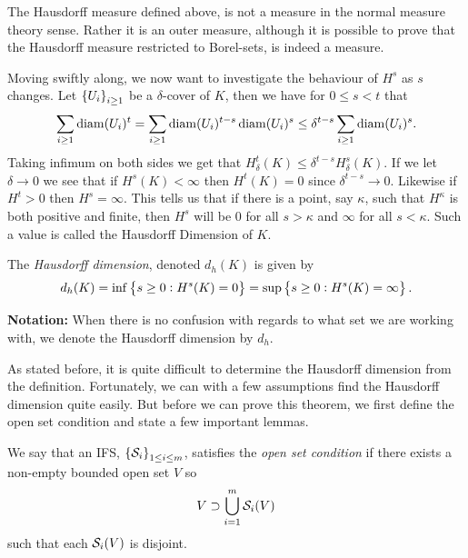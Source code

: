 \medskip
\begin{remark}
	The Hausdorff measure defined above, is not a measure in the normal measure theory sense. Rather it is an outer measure, although it is possible to prove that the Hausdorff measure restricted to Borel-sets, is indeed a measure.
\end{remark}

\medskip
Moving swiftly along, we now want to investigate the behaviour of $H^{s}$ as $s$ changes. Let $\cbr{U_i}_{i \geq 1}$ be a $\delta$-cover of $K$, then we have for $0 \leq s < t$ that
\begin{equation}
	\sum_{i \geq 1} \diam(U_i)^{t} = \sum_{i \geq 1} \diam(U_i)^{t-s}\diam(U_i)^{s} \leq \delta^{t-s}\sum_{i \geq 1}\diam(U_i)^{s}.
\end{equation}
Taking infimum on both sides we get that $H^t_{\delta}(K) \leq \delta^{t-s}H^s_{\delta}(K)$. If we let $\delta \to 0$ we see that if $H^{s}(K) < \infty$ then $H^{t}(K) = 0$ since $\delta^{t-s} \to 0$. Likewise if $H^{t} > 0$ then $H^{s} = \infty$. 
This tells us that if there is a point, say $\kappa$, such that $H^{\kappa}$ is both positive and finite, then $H^{s}$ will be 0 for all $s > \kappa$ and $\infty$ for all $s < \kappa$. Such a value is called the Hausdorff Dimension of $K$.

\medskip
\begin{defi}\label{hausdorffDimDefi}
	The \emph{Hausdorff dimension}, denoted $d_h(K)$ is given by
	\begin{equation}
		d_h(K) = \inf\cbr{s \geq 0 : H^{s}(K) = 0} = \sup\cbr{s \geq 0 : H^{s}(K) = \infty}.
	\end{equation}
\end{defi} 
\textbf{Notation:} When there is no confusion with regards to what set we are working with, we denote the Hausdorff dimension by $d_h$.

\medskip
As stated before, it is quite difficult to determine the Hausdorff dimension from the definition. Fortunately, we can with a few assumptions find the Hausdorff dimension quite easily. But before we can prove this theorem, we first define the open set condition and state a few important lemmas.

\medskip
\begin{defi}\label{OpenSetCondition}
	We say that an IFS, $\cbr{\fracConst_i}_{1 \leq i \leq m}$, satisfies the \emph{open set condition} if there exists a non-empty bounded open set $V$ so
	\begin{equation}
		V \supset \bigcup_{i = 1}^{m} \mathcal{S}_i(V)
	\end{equation}
	such that each $\mathcal{S}_{i}(V)$ is disjoint.
\end{defi}

